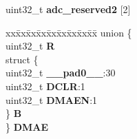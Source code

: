 \begin{DoxyCompactItemize}
\begin{tabbing}
\end{tabbing}\item 
\mbox{\label{structADC__tag_a4f409e9d1d5fa111cd5560b66f66438c}} 
uint32\+\_\+t {\bfseries adc\+\_\+reserved2} \mbox{[}2\mbox{]}
\item 
\mbox{\label{structADC__tag_adba7df0f2d6892c0e897c91bb19fb4ff}} 
\begin{tabbing}
xx\=xx\=xx\=xx\=xx\=xx\=xx\=xx\=xx\=\kill
union \{\\
\>uint32\_t {\bfseries R}\\
\>struct \{\\
\>\>uint32\_t {\bfseries \_\_pad0\_\_}:30\\
\>\>uint32\_t {\bfseries DCLR}:1\\
\>\>uint32\_t {\bfseries DMAEN}:1\\
\>\} {\bfseries B}\\
\} {\bfseries DMAE}\\


\end{tabbing}
\end{DoxyCompactItemize}
